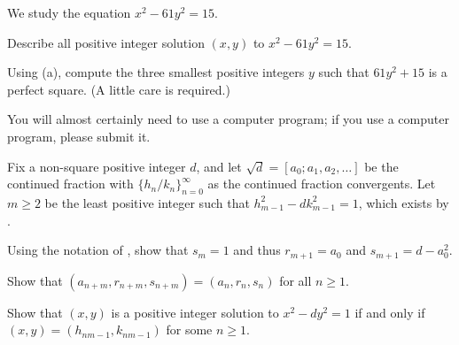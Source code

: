 \documentclass[../notes.tex]{subfiles}
\begin{document}
\begin{prob}[5 points]
	We study the equation $x^2-61y^2=15$.
	\begin{listalph}
		\item Describe all positive integer solution $(x,y)$ to $x^2-61y^2=15$.
		\item Using (a), compute the three smallest positive integers $y$ such that $61y^2+15$ is a perfect square. (A little care is required.)
	\end{listalph}
	You will almost certainly need to use a computer program; if you use a computer program, please submit it.
\end{prob}
\begin{prob}[7 points]
	Fix a non-square positive integer $d$, and let $\sqrt d=[a_0;a_1,a_2,\ldots]$ be the continued fraction with $\{h_n/k_n\}_{n=0}^\infty$ as the continued fraction convergents. Let $m\ge2$ be the least positive integer such that $h_{m-1}^2-dk_{m-1}^2=1$, which exists by .
	\begin{listalph}
		\item Using the notation of , show that $s_m=1$ and thus $r_{m+1}=a_0$ and $s_{m+1}=d-a_0^2$.
		\item Show that $(a_{n+m},r_{n+m},s_{n+m})=(a_n,r_n,s_n)$ for all $n\ge1$.
		\item Show that $(x,y)$ is a positive integer solution to $x^2-dy^2=1$ if and only if $(x,y)=(h_{nm-1},k_{nm-1})$ for some $n\ge1$.
	\end{listalph}
\end{prob}
\end{document}

